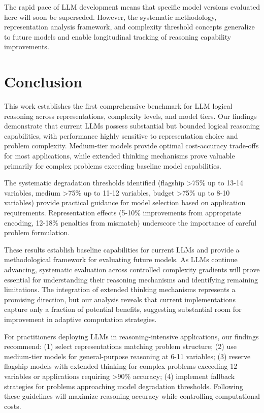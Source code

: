 \documentclass[pdflatex,sn-mathphys-num]{sn-jnl}%
\theoremstyle{thmstyleone}%
\theoremstyle{thmstyletwo}%
\theoremstyle{thmstylethree}%
\begin{document}
The rapid pace of LLM development means that specific model versions evaluated here will soon be superseded. However, the systematic methodology, representation analysis framework, and complexity threshold concepts generalize to future models and enable longitudinal tracking of reasoning capability improvements.

\section{Conclusion}\label{sec:conclusion}

This work establishes the first comprehensive benchmark for LLM logical reasoning across representations, complexity levels, and model tiers. Our findings demonstrate that current LLMs possess substantial but bounded logical reasoning capabilities, with performance highly sensitive to representation choice and problem complexity. Medium-tier models provide optimal cost-accuracy trade-offs for most applications, while extended thinking mechanisms prove valuable primarily for complex problems exceeding baseline model capabilities.

The systematic degradation thresholds identified (flagship >75\% up to 13-14 variables, medium >75\% up to 11-12 variables, budget >75\% up to 8-10 variables) provide practical guidance for model selection based on application requirements. Representation effects (5-10\% improvements from appropriate encoding, 12-18\% penalties from mismatch) underscore the importance of careful problem formulation.

These results establish baseline capabilities for current LLMs and provide a methodological framework for evaluating future models. As LLMs continue advancing, systematic evaluation across controlled complexity gradients will prove essential for understanding their reasoning mechanisms and identifying remaining limitations. The integration of extended thinking mechanisms represents a promising direction, but our analysis reveals that current implementations capture only a fraction of potential benefits, suggesting substantial room for improvement in adaptive computation strategies.

For practitioners deploying LLMs in reasoning-intensive applications, our findings recommend: (1) select representations matching problem structure; (2) use medium-tier models for general-purpose reasoning at 6-11 variables; (3) reserve flagship models with extended thinking for complex problems exceeding 12 variables or applications requiring >90\% accuracy; (4) implement fallback strategies for problems approaching model degradation thresholds. Following these guidelines will maximize reasoning accuracy while controlling computational costs.
\end{document}
